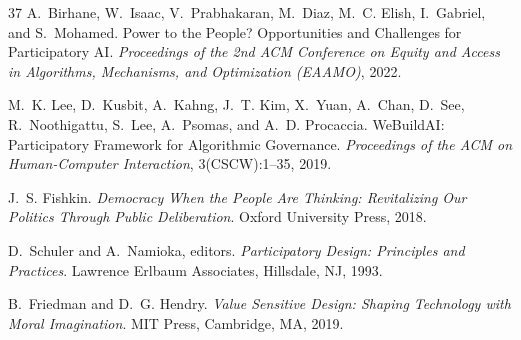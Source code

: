 \documentclass[12pt]{article}
\begin{document}
\begin{thebibliography}{37}
A.~Birhane, W.~Isaac, V.~Prabhakaran, M.~Diaz, M.~C. Elish, I.~Gabriel, and S.~Mohamed.
\newblock Power to the People? Opportunities and Challenges for Participatory AI.
\newblock \emph{Proceedings of the 2nd ACM Conference on Equity and Access in Algorithms, Mechanisms, and Optimization (EAAMO)}, 2022.

M.~K. Lee, D.~Kusbit, A.~Kahng, J.~T. Kim, X.~Yuan, A.~Chan, D.~See, R.~Noothigattu, S.~Lee, A.~Psomas, and A.~D. Procaccia.
\newblock WeBuildAI: Participatory Framework for Algorithmic Governance.
\newblock \emph{Proceedings of the ACM on Human-Computer Interaction}, 3(CSCW):1--35, 2019.

J.~S. Fishkin.
\newblock \emph{Democracy When the People Are Thinking: Revitalizing Our Politics Through Public Deliberation}.
\newblock Oxford University Press, 2018.

D.~Schuler and A.~Namioka, editors.
\newblock \emph{Participatory Design: Principles and Practices}.
\newblock Lawrence Erlbaum Associates, Hillsdale, NJ, 1993.

B.~Friedman and D.~G. Hendry.
\newblock \emph{Value Sensitive Design: Shaping Technology with Moral Imagination}.
\newblock MIT Press, Cambridge, MA, 2019.

\end{thebibliography}
\end{document}
